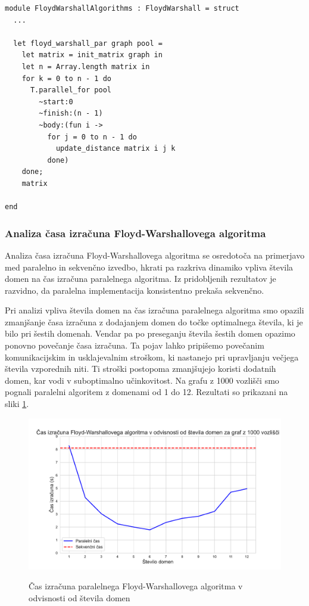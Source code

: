 \documentclass[mat1, tisk]{fmfdelo}
\begin{document}
\begin{lstlisting}
module FloydWarshallAlgorithms : FloydWarshall = struct
  ...

  let floyd_warshall_par graph pool =
    let matrix = init_matrix graph in
    let n = Array.length matrix in
    for k = 0 to n - 1 do
      T.parallel_for pool 
        ~start:0 
        ~finish:(n - 1) 
        ~body:(fun i ->
          for j = 0 to n - 1 do
            update_distance matrix i j k
          done)
    done;
    matrix

end
\end{lstlisting}

\subsubsection{Analiza časa izračuna Floyd-Warshallovega algoritma}

Analiza časa izračuna Floyd-Warshallovega algoritma se osredotoča na primerjavo med paralelno in sekvenčno izvedbo, hkrati pa razkriva
dinamiko vpliva števila domen na čas izračuna paralelnega algoritma. Iz pridobljenih rezultatov je razvidno, da paralelna implementacija
konsistentno prekaša sekvenčno.

Pri analizi vpliva števila domen na čas izračuna paralelnega algoritma smo opazili zmanjšanje časa izračuna z dodajanjem domen do točke
optimalnega števila, ki je bilo pri šestih domenah. Vendar pa po preseganju števila šestih domen opazimo ponovno povečanje časa izračuna.
Ta pojav lahko pripišemo povečanim komunikacijskim in usklajevalnim stroškom, ki nastanejo pri upravljanju večjega števila vzporednih niti.
Ti stroški postopoma zmanjšujejo koristi dodatnih domen, kar vodi v suboptimalno učinkovitost.
Na grafu z 1000 vozlišči smo pognali paralelni algoritem z domenami od 1 do 12. Rezultati so prikazani na sliki \ref{fig:floyd_v_odvisnosti_od_stevila_domen}.


\begin{figure}[h!]
  \centering
  \caption{Čas izračuna paralelnega Floyd-Warshallovega algoritma v odvisnosti od števila domen}
  \includegraphics[width=15cm]{slike/floyd_v_odvisnosti_od_stevila_domen.pdf}
  \label{fig:floyd_v_odvisnosti_od_stevila_domen}
\end{figure}
\end{document}

